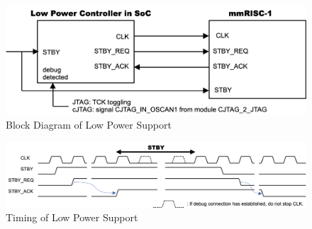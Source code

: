 \begin{figure}[H]
    \includegraphics[width=1.00\columnwidth]{./Figure/LowPowerBlockDiagram.png}
    \caption{Block Diagram of Low Power Support}
    \label{fig:LOWPOWERBLOCKDIAGRAM}
\end{figure}

\begin{figure}[H]
    \includegraphics[width=1.00\columnwidth]{./Figure/LowPowerTiming.png}
    \caption{Timing of Low Power Support}
    \label{fig:LOWPOWERTIMING}
\end{figure}



